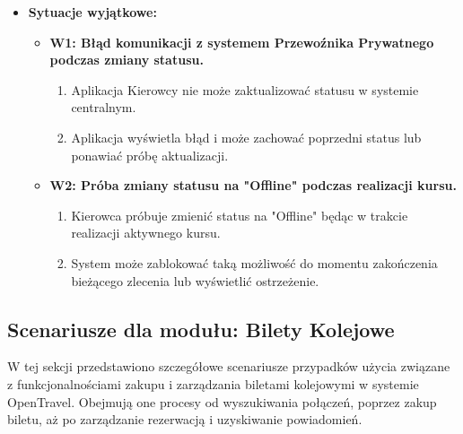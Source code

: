 \documentclass[a4paper,12pt]{article}
\begin{document}
\begin{itemize}
\begin{itemize}
        \end{itemize}
    \item \textbf{Sytuacje wyjątkowe:}
        \begin{itemize}
            \item \textbf{W1: Błąd komunikacji z systemem Przewoźnika Prywatnego podczas zmiany statusu.}
                \begin{enumerate}
                    \item Aplikacja Kierowcy nie może zaktualizować statusu w systemie centralnym.
                    \item Aplikacja wyświetla błąd i może zachować poprzedni status lub ponawiać próbę aktualizacji.
                \end{enumerate}
            \item \textbf{W2: Próba zmiany statusu na "Offline" podczas realizacji kursu.}
                \begin{enumerate}
                    \item Kierowca próbuje zmienić status na "Offline" będąc w trakcie realizacji aktywnego kursu.
                    \item System może zablokować taką możliwość do momentu zakończenia bieżącego zlecenia lub wyświetlić ostrzeżenie.
                \end{enumerate}
        \end{itemize}
\end{itemize}

\subsection{Scenariusze dla modułu: Bilety Kolejowe}
W tej sekcji przedstawiono szczegółowe scenariusze przypadków użycia związane z funkcjonalnościami zakupu i zarządzania biletami kolejowymi w systemie OpenTravel. Obejmują one procesy od wyszukiwania połączeń, poprzez zakup biletu, aż po zarządzanie rezerwacją i uzyskiwanie powiadomień.
\end{document}
